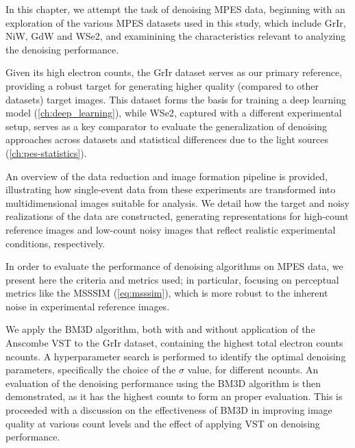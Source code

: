 In this chapter, we attempt the task of denoising \gls{MPES} data, beginning with an exploration of the various \gls{MPES} datasets used in this study, which include \gls{GrIr}, \gls{NiW}, \gls{GdW} and \gls{WSe2}, and examinining the characteristics relevant to analyzing the denoising performance.

Given its high electron counts, the \gls{GrIr} dataset serves as our primary reference, providing a robust target for generating higher quality (compared to other datasets) target images. This dataset forms the basis for training a deep learning model (\cref{ch:deep_learning}), while \gls{WSe2}, captured with a different experimental setup, serves as a key comparator to evaluate the generalization of denoising approaches across datasets and statistical differences due to the light sources (\cref{ch:pes-statistics}).

An overview of the data reduction and image formation pipeline is provided, illustrating how single-event data from these experiments are transformed into multidimensional images suitable for analysis. We detail how the target and noisy realizations of the data are constructed, generating representations for high-count reference images and low-count noisy images that reflect realistic experimental conditions, respectively.

In order to evaluate the performance of denoising algorithms on \gls{MPES} data, we present here the criteria and metrics used; in particular, focusing on perceptual metrics like the \gls{MSSSIM} (\cref{eq:msssim}), which is more robust to the inherent noise in experimental reference images.

We apply the \gls{BM3D} algorithm, both with and without application of the Anscombe \gls{VST} to the \gls{GrIr} dataset, containing the highest total electron counts \gls{ncounts}. A hyperparameter search is performed to identify the optimal denoising parameters, specifically the choice of the $\sigma$ value, for different \gls{ncounts}. An evaluation of the denoising performance using the \gls{BM3D} algorithm is then demonstrated, as it has the highest counts to form an proper evaluation. This is proceeded with a discussion on the effectiveness of \gls{BM3D} in improving image quality at various count levels and the effect of applying \gls{VST} on denoising performance.


